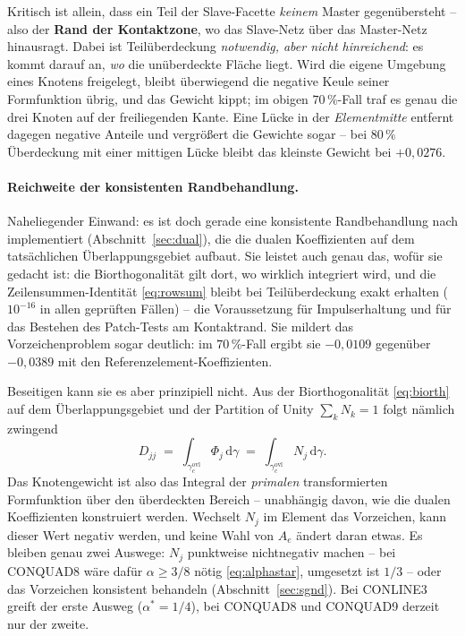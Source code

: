\documentclass[a4paper,11pt]{article}
\def\bm#1{#1}%
\def\tfrac#1#2{#1/#2}%
\def\tilde#1{#1}%
\begin{document}
Kritisch ist allein, dass ein Teil der Slave-Facette \emph{keinem} Master gegenübersteht -- also der
\textbf{Rand der Kontaktzone}, wo das Slave-Netz über das Master-Netz hinausragt. Dabei ist
Teilüberdeckung \emph{notwendig, aber nicht hinreichend}: es kommt darauf an, \emph{wo} die
unüberdeckte Fläche liegt. Wird die eigene Umgebung eines Knotens freigelegt, bleibt überwiegend die
negative Keule seiner Formfunktion übrig, und das Gewicht kippt; im obigen $70\,\%$-Fall traf es
genau die drei Knoten auf der freiliegenden Kante. Eine Lücke in der \emph{Elementmitte} entfernt
dagegen negative Anteile und vergrößert die Gewichte sogar -- bei $80\,\%$ Überdeckung mit einer
mittigen Lücke bleibt das kleinste Gewicht bei $+0{,}0276$.

\paragraph{Reichweite der konsistenten Randbehandlung.} Naheliegender Einwand: es ist doch
gerade eine konsistente Randbehandlung nach \citet{cichosz} implementiert
(Abschnitt~\ref{sec:dual}), die die dualen Koeffizienten auf dem tatsächlichen Überlappungsgebiet
aufbaut. Sie leistet auch genau das, wofür sie gedacht ist: die Biorthogonalität gilt dort, wo
wirklich integriert wird, und die Zeilensummen-Identität \eqref{eq:rowsum} bleibt bei
Teilüberdeckung exakt erhalten ($10^{-16}$ in allen geprüften Fällen) -- die Voraussetzung für
Impulserhaltung und für das Bestehen des Patch-Tests am Kontaktrand. Sie mildert das
Vorzeichenproblem sogar deutlich: im $70\,\%$-Fall ergibt sie $-0{,}0109$ gegenüber $-0{,}0389$ mit
den Referenzelement-Koeffizienten.

Beseitigen kann sie es aber prinzipiell nicht. Aus der Biorthogonalität \eqref{eq:biorth} auf dem
Überlappungsgebiet und der Partition of Unity $\sum_k\tilde N_k=1$ folgt nämlich zwingend
\begin{equation}
\tilde D_{jj} \;=\; \int_{\gamma_c^{\text{ovl}}}\Phi_j\,\mathrm d\gamma
\;=\; \int_{\gamma_c^{\text{ovl}}}\tilde N_j\,\mathrm d\gamma .
\label{eq:weightisprimal}
\end{equation}
Das Knotengewicht ist also das Integral der \emph{primalen} transformierten Formfunktion über den
überdeckten Bereich -- unabhängig davon, wie die dualen Koeffizienten konstruiert werden. Wechselt
$\tilde N_j$ im Element das Vorzeichen, kann dieser Wert negativ werden, und keine Wahl von
$\bm A_e$ ändert daran etwas. Es bleiben genau zwei Auswege: $\tilde N_j$ punktweise nichtnegativ
machen -- bei CONQUAD8 wäre dafür $\alpha\ge\tfrac38$ nötig \eqref{eq:alphastar}, umgesetzt ist
$\tfrac13$ -- oder das Vorzeichen konsistent behandeln (Abschnitt~\ref{sec:sgnd}). Bei CONLINE3
greift der erste Ausweg ($\alpha^\ast=\tfrac14$), bei CONQUAD8 und CONQUAD9 derzeit nur der zweite.
\end{document}
